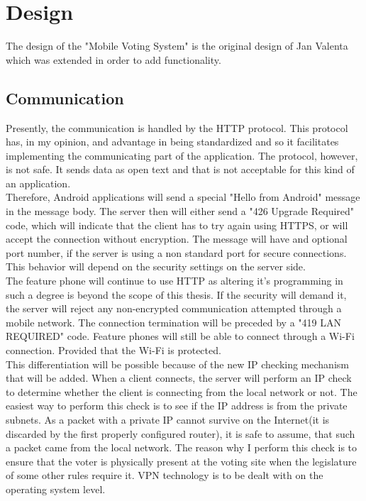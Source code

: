 \documentclass[11pt,twoside,a4paper]{book}
\begin{document}

\chapter{Design}
The design of the "Mobile Voting System" is the original design of Jan Valenta which was extended in order to add functionality.
\section{Communication}

Presently, the communication is handled by the HTTP protocol. This protocol has, in my opinion, and advantage in being standardized and so it facilitates implementing the communicating part of the application. The protocol, however, is not safe. It sends data as open text and that is not acceptable for this kind of an application.\\
 Therefore, Android applications will send a special "Hello from Android" message in the message body. The server then will either send a "426 Upgrade Required" code, which will indicate that the client has to try again using HTTPS, or will accept the connection without encryption. The message will have and optional port number, if the server is using a non standard port for secure connections. This behavior will depend on the security settings on the server side. \\
  The feature phone will continue to use HTTP as altering it's programming in such a degree is beyond the scope of this thesis. If the security will demand it, the server will reject any non-encrypted communication attempted through a mobile network. The connection termination will be preceded by a "419 LAN REQUIRED" code. Feature phones will still be able to connect through a Wi-Fi connection. Provided that the Wi-Fi is protected.\\
 
This differentiation will be possible because of the new IP checking mechanism that will be added. When a client connects, the server will perform an IP check to determine whether the client is connecting from the local network or not. The easiest way to perform this check is to see if the IP address is from the private subnets. As a packet with a private IP cannot survive on the Internet(it is discarded by the first properly configured router), it is safe to assume, that such a packet came from the local network. The reason why I perform this check is to ensure that the voter is physically present at the voting site when the legislature of some other rules require it. VPN technology is to be dealt with on the operating system level.\\
\end{document}
